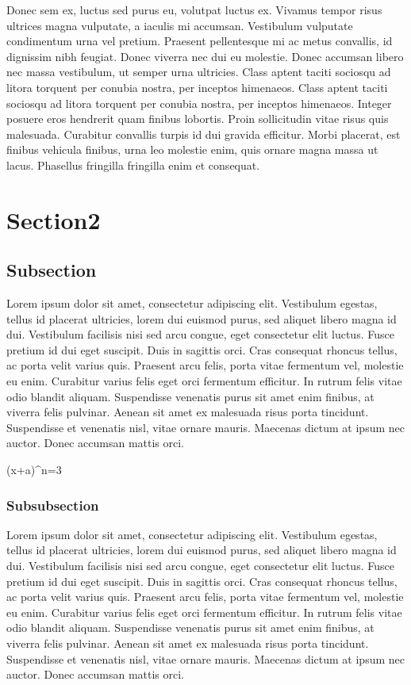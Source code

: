 \documentclass{thesis}
\begin{document}
Donec sem ex, luctus sed purus eu, volutpat luctus ex. Vivamus tempor risus ultrices magna vulputate, a iaculis mi accumsan. Vestibulum vulputate condimentum urna vel pretium. Praesent pellentesque mi ac metus convallis, id dignissim nibh feugiat. Donec viverra nec dui eu molestie. Donec accumsan libero nec massa vestibulum, ut semper urna ultricies. Class aptent taciti sociosqu ad litora torquent per conubia nostra, per inceptos himenaeos. Class aptent taciti sociosqu ad litora torquent per conubia nostra, per inceptos himenaeos. Integer posuere eros hendrerit quam finibus lobortis. Proin sollicitudin vitae risus quis malesuada. Curabitur convallis turpis id dui gravida efficitur. Morbi placerat, est finibus vehicula finibus, urna leo molestie enim, quis ornare magna massa ut lacus. Phasellus fringilla fringilla enim et consequat.

\section{Section2}
\subsection{Subsection}

Lorem ipsum dolor sit amet, consectetur adipiscing elit. Vestibulum egestas, tellus id placerat ultricies, lorem dui euismod purus, sed aliquet libero magna id dui. Vestibulum facilisis nisi sed arcu congue, eget consectetur elit luctus. Fusce pretium id dui eget suscipit. Duis in sagittis orci. Cras consequat rhoncus tellus, ac porta velit varius quis. Praesent arcu felis, porta vitae fermentum vel, molestie eu enim. Curabitur varius felis eget orci fermentum efficitur. In rutrum felis vitae odio blandit aliquam. Suspendisse venenatis purus sit amet enim finibus, at viverra felis pulvinar. Aenean sit amet ex malesuada risus porta tincidunt. Suspendisse et venenatis nisl, vitae ornare mauris. Maecenas dictum at ipsum nec auctor. Donec accumsan mattis orci. 

\begin{thesisequation}{2}
	(x+a)^n=3
\end{thesisequation}

\subsubsection{Subsubsection}
Lorem ipsum dolor sit amet, consectetur adipiscing elit. Vestibulum egestas, tellus id placerat ultricies, lorem dui euismod purus, sed aliquet libero magna id dui. Vestibulum facilisis nisi sed arcu congue, eget consectetur elit luctus. Fusce pretium id dui eget suscipit. Duis in sagittis orci. Cras consequat rhoncus tellus, ac porta velit varius quis. Praesent arcu felis, porta vitae fermentum vel, molestie eu enim. Curabitur varius felis eget orci fermentum efficitur. In rutrum felis vitae odio blandit aliquam. Suspendisse venenatis purus sit amet enim finibus, at viverra felis pulvinar. Aenean sit amet ex malesuada risus porta tincidunt. Suspendisse et venenatis nisl, vitae ornare mauris. Maecenas dictum at ipsum nec auctor. Donec accumsan mattis orci. 
\end{document}
